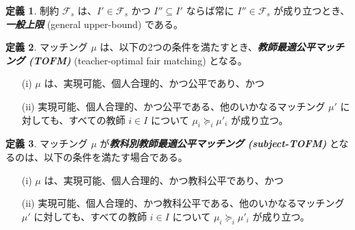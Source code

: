 \documentclass[12pt, a4paper]{article}
\theoremstyle{definition}
\newtheorem{defn}{定義}
\theoremstyle{remark}
\theoremstyle{plain}
\begin{document}
  


\begin{defn}
制約 $\mathcal{F}_s$ は、$I' \in \mathcal{F}_s$ かつ $I'' \subseteq I'$ ならば常に $I'' \in \mathcal{F}_s$ が成り立つとき、\textbf{\textit{一般上限}} (general upper-bound) である。
\end{defn}

\begin{defn}
マッチング $\mu$ は、以下の2つの条件を満たすとき、\textbf{\textit{教師最適公平マッチング (TOFM)}} (teacher-optimal fair matching) となる。
\begin{itemize}
    \item[(i)] $\mu$ は、実現可能、個人合理的、かつ公平であり、かつ
    \item[(ii)] 実現可能、個人合理的、かつ公平である、他のいかなるマッチング $\mu'$ に対しても、すべての教師 $i \in I$ について $\mu_i \succeq_i \mu'_i$ が成り立つ。
\end{itemize}
\end{defn}

\begin{defn}
マッチング $\mu$ が\textbf{\textit{教科別教師最適公平マッチング (subject-TOFM)}} となるのは、以下の条件を満たす場合である。
\begin{itemize}
    \item[(i)] $\mu$ は、実現可能、個人合理的、かつ教科公平であり、かつ
    \item[(ii)] 実現可能、個人合理的、かつ教科公平である、他のいかなるマッチング $\mu'$ に対しても、すべての教師 $i \in I$ について $\mu_i \succeq_i \mu'_i$ が成り立つ。
\end{itemize}
\end{defn}



\end{document}
